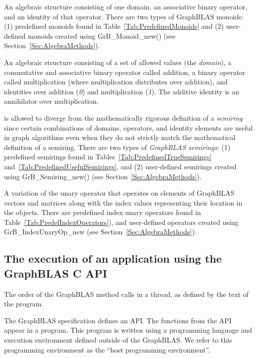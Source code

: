  An algebraic structure consisting of one domain, an associative 
binary operator, and an identity of that operator.  There are two types 
of GraphBLAS monoids: (1) predefined monoids found in 
Table~\ref{Tab:PredefinedMonoids} and (2) user-defined monoids created using 
{\sf GrB\_Monoid\_new()} (see Section~\ref{Sec:AlgebraMethods}). 

 An algebraic structure consisting of a set of allowed values
(the \emph{domain}), a commutative and associative binary operator called addition, a binary operator 
called multiplication (where multiplication distributes over addition),
and identities over addition (\emph{0}) and multiplication (\emph{1}).  The additive
identity is an annihilator over multiplication.   

 is allowed to diverge from the mathematically 
rigorous definition of a \emph{semiring} since certain combinations of domains, operators, and identity 
elements are useful in graph algorithms even when they do not strictly match the mathematical
definition of a semiring.
There are two types 
of \emph{GraphBLAS semirings}: (1) predefined semirings found in 
Tables~\ref{Tab:PredefinedTrueSemirings} and~\ref{Tab:PredefinedUsefulSemirings}, and (2) user-defined semirings created using 
{\sf GrB\_Semiring\_new()} (see Section~\ref{Sec:AlgebraMethods}).

 A variation of the unary operator that operates
on elements of GraphBLAS vectors and matrices along with the index values 
representing their location in the objects.  There are predefined index unary
operators found in Table~\ref{Tab:PredefIndexOperators}), and user-defined
operators created using {\sf GrB\_IndexUnaryOp\_new} (see Section~\ref{Sec:AlgebraMethods}).
\glossEnd


\subsection{The execution of an application using the GraphBLAS C API}

\glossBegin
{} The order of the GraphBLAS method calls in a
thread, as defined by the text of the program.

 The GraphBLAS specification defines an API.  
The functions from the API appear in a program.  This program is written using a programming language
and execution environment defined outside of the GraphBLAS.  We refer to this programming environment
as the ``host programming environment''.

